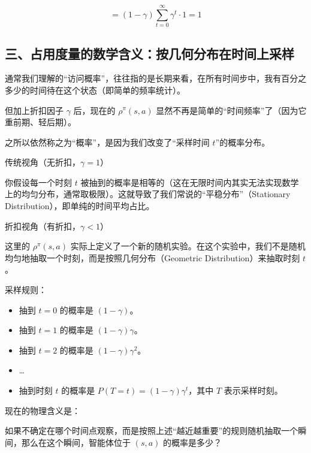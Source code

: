 \[
= (1-\gamma)\sum_{t=0}^{\infty}\gamma^t \cdot 1 = 1
\]

\hypertarget{ux4e09ux5360ux7528ux5ea6ux91cfux7684ux6570ux5b66ux542bux4e49ux6309ux51e0ux4f55ux5206ux5e03ux5728ux65f6ux95f4ux4e0aux91c7ux6837}{%
\subsection{三、占用度量的数学含义：按几何分布在时间上采样}\label{ux4e09ux5360ux7528ux5ea6ux91cfux7684ux6570ux5b66ux542bux4e49ux6309ux51e0ux4f55ux5206ux5e03ux5728ux65f6ux95f4ux4e0aux91c7ux6837}}

通常我们理解的``访问概率''，往往指的是长期来看，在所有时间步中，我有百分之多少的时间待在这个状态（即简单的频率统计）。

但加上折扣因子 \(\gamma\) 后，现在的 \(\rho^\pi(s,a)\) 显然不再是简单的``时间频率''了（因为它重前期、轻后期）。

之所以依然称之为``概率''，是因为我们改变了``采样时间 \(t\)''的概率分布。

传统视角（无折扣，\(\gamma=1\)）

你假设每一个时刻 \(t\) 被抽到的概率是相等的（这在无限时间内其实无法实现数学上的均匀分布，通常取极限）。这就导致了我们常说的``平稳分布''（Stationary Distribution），即单纯的时间平均占比。

折扣视角（有折扣，\(\gamma<1\)）

这里的 \(\rho^\pi(s,a)\) 实际上定义了一个新的随机实验。在这个实验中，我们不是随机均匀地抽取一个时刻，而是按照几何分布（Geometric Distribution）来抽取时刻 \(t\)。

采样规则：

\begin{itemize}
\tightlist
\item
  抽到 \(t=0\) 的概率是 \((1-\gamma)\)。
\item
  抽到 \(t=1\) 的概率是 \((1-\gamma)\gamma\)。
\item
  抽到 \(t=2\) 的概率是 \((1-\gamma)\gamma^2\)。
\item
  \ldots{}
\item
  抽到时刻 \(t\) 的概率是 \(P(T=t)=(1-\gamma)\gamma^t\)，其中 \(T\) 表示采样时刻。
\end{itemize}

现在的物理含义是：

如果不确定在哪个时间点观察，而是按照上述``越近越重要''的规则随机抽取一个瞬间，那么在这个瞬间，智能体位于 \((s,a)\) 的概率是多少？

